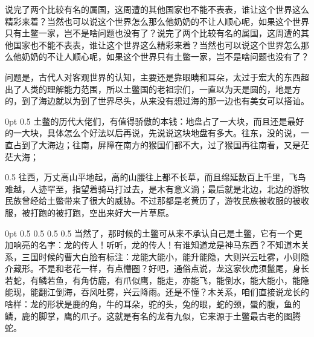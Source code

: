 \documentclass{article}%
\begin{document}
说完了两个比较有名的属国，这周遭的其他国家也不能不表表，谁让这个世界这么精彩来着？当然也可以说这个世界怎么那么他奶奶的不让人顺心呢，如果这个世界只有土鳖一家，岂不是啥问题也没有了？说完了两个比较有名的属国，这周遭的其他国家也不能不表表，谁让这个世界这么精彩来着？当然也可以说这个世界怎么那么他奶奶的不让人顺心呢，如果这个世界只有土鳖一家，岂不是啥问题也没有了？

问题是，古代人对客观世界的认知，主要还是靠眼睛和耳朵，太过于宏大的东西超出了人类的理解能力范围，所以土鳖国的老祖宗们，一直以为天是圆的，地是方的，到了海边就以为到了世界尽头，从来没有想过海的那一边也有美女可以搭讪。

 0pt 0.5\linewidth
土鳖的历代大佬们，有值得骄傲的本钱：地盘占了一大块，而且还是最好的一大块，具体怎么个好法以后再说，先说说这块地盘有多大。往东，没的说，一直占到了大海边；往南，屏障在南方的猴国们都不大，过了猴国再往南看，又是茫茫大海；

 0.5\linewidth
往西，万丈高山平地起，高的山腰往上都不长草，而且绵延数百上千里，飞鸟难越，人迹罕至，指望着骑马打过去，是木有意义滴；最后就是北边，北边的游牧民族曾经给土鳖带来了很大的威胁。不过那都是老黄历了，游牧民族被收服的被收服，被打跑的被打跑，空出来好大一片草原。

 0pt 0.5\linewidth 0pt 0.5\linewidth 0pt 0.5\linewidth 0pt 0.5\linewidth 0pt \linewidth
当然了，那时候的土鳖可从来不承认自己是土鳖，它有一个更加响亮的名字：龙的传人！听听，龙的传人！有谁知道龙是神马东西？不知道木关系，三国时候的曹大白脸有标注：龙能大能小，能升能隐，大则兴云吐雾，小则隐介藏形。不是和老花一样，有点懵圈？好吧，通俗点说，龙这家伙虎须鬣尾，身长若蛇，有鳞若鱼，有角仿鹿，有爪似鹰，能走，亦能飞，能倒水，能大能小，能隐能现，能翻江倒海，吞风吐雾，兴云降雨。还是不懂？木关系，咱们直接说龙长的啥样：龙的形状是鹿的角，牛的耳朵，驼的头，兔的眼，蛇的颈，蜃的腹，鱼的鳞，鹿的脚掌，鹰的爪子。这就是有名的龙有九似，它来源于土鳖最古老的图腾蛇。

%

\end{document}
